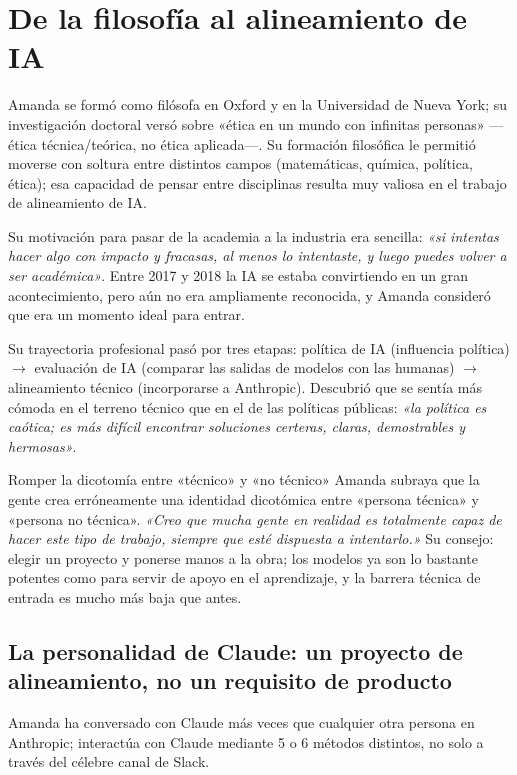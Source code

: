 \section{De la filosofía al alineamiento de IA}

Amanda se formó como filósofa en Oxford y en la Universidad de Nueva York; su investigación doctoral versó sobre «ética en un mundo con infinitas personas» —ética técnica/teórica, no ética aplicada—. Su formación filosófica le permitió moverse con soltura entre distintos campos (matemáticas, química, política, ética); esa capacidad de pensar entre disciplinas resulta muy valiosa en el trabajo de alineamiento de IA.

Su motivación para pasar de la academia a la industria era sencilla: \textit{«si intentas hacer algo con impacto y fracasas, al menos lo intentaste, y luego puedes volver a ser académica»}. Entre 2017 y 2018 la IA se estaba convirtiendo en un gran acontecimiento, pero aún no era ampliamente reconocida, y Amanda consideró que era un momento ideal para entrar.

Su trayectoria profesional pasó por tres etapas: política de IA (influencia política) $\to$ evaluación de IA (comparar las salidas de modelos con las humanas) $\to$ alineamiento técnico (incorporarse a Anthropic). Descubrió que se sentía más cómoda en el terreno técnico que en el de las políticas públicas: \textit{«la política es caótica; es más difícil encontrar soluciones certeras, claras, demostrables y hermosas»}.

\begin{knowledgebox}{Romper la dicotomía entre «técnico» y «no técnico»}
Amanda subraya que la gente crea erróneamente una identidad dicotómica entre «persona técnica» y «persona no técnica». \textit{«Creo que mucha gente en realidad es totalmente capaz de hacer este tipo de trabajo, siempre que esté dispuesta a intentarlo.»} Su consejo: elegir un proyecto y ponerse manos a la obra; los modelos ya son lo bastante potentes como para servir de apoyo en el aprendizaje, y la barrera técnica de entrada es mucho más baja que antes.
\end{knowledgebox}

\subsection{La personalidad de Claude: un proyecto de alineamiento, no un requisito de producto}

Amanda ha conversado con Claude más veces que cualquier otra persona en Anthropic; interactúa con Claude mediante 5 o 6 métodos distintos, no solo a través del célebre canal de Slack.

